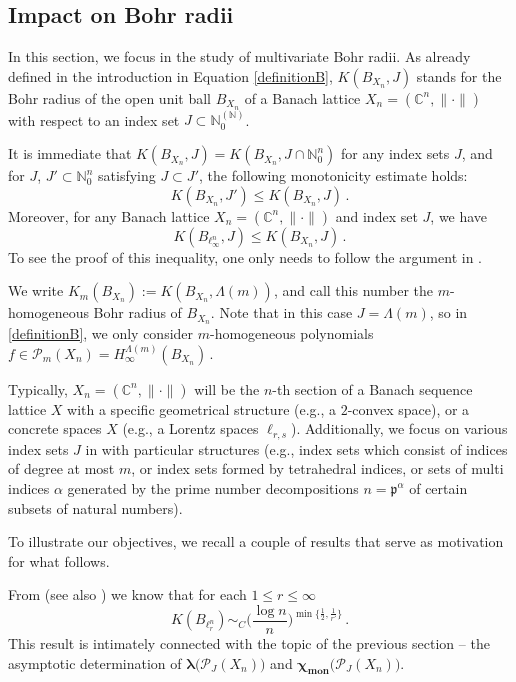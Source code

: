 \documentclass[12pt]{amsart}
\numberwithin{subsection}{section}
\theoremstyle{definition}
\theoremstyle{remark}
\newcommand{\NN}{\mathbb N}
\newcommand{\CC}{\mathbb C}
\DeclareMathOperator{\mon}{mon}
\newcommand{\chimon}{\chi_{\mon}}
\begin{document}
\subsection{Impact on Bohr radii} \label{Part: Bohr radii}

In this section, we focus in the study of multivariate Bohr radii. As already defined in the introduction in Equation
\eqref{definitionB},
$K(B_{X_n},J)$ stands for 
the Bohr radius of the open unit ball $B_{X_n}$ 
of a Banach lattice  ${X_n} = (\CC^n, \| \cdot \|)$
with respect to an index set $J \subset \mathbb{N}_0^{(\NN)}$.

It is immediate that $K(B_{X_n},J) =  K(B_{X_n},J \cap \mathbb{N}_0^n)$ for any index sets $J$, and for $J$, $J' \subset \mathbb{N}_0^{n}$ satisfying $J \subset J'$, the following monotonicity estimate holds:
\begin{equation}\label{rem: bohr radii monotony}
K(B_{X_n},J') \le K(B_{X_n},J)\,.
\end{equation}
Moreover, for any Banach lattice  ${X_n} = (\CC^n, \| \cdot \|)$ and index set  $J$, we have
\begin{equation}\label{lowinfty}
K(B_{\ell_\infty^n},J) \leq K(B_{X_n},J)\,.
\end{equation}
To see the proof of this inequality, one only needs to follow the argument
in \cite[Proposition 19.2]{defant2019libro}.

We write $ K_m(B_{X_n}):= K(B_{X_n},\Lambda(m))$,
and call this number  the $m$-homogeneous Bohr radius of $B_{X_n}$. Note that in this case $J=\Lambda(m)$, so in \eqref{definitionB},
we only consider $m$-homogeneous  polynomials $f \in \mathcal{P}_m( X_n) = H^{\Lambda(m)}_\infty (B_{X_n})\,.$

Typically, $X_{n} = (\CC^n, \| \cdot \|)$ will be the $n$-th section of a Banach sequence lattice  $X$ with a specific geometrical
structure (e.g., a $2$-convex space), or a concrete spaces $X$ (e.g., a Lorentz spaces $\ell_{r,s}$). Additionally,  we focus on various
index sets $J$ in with particular  structures (e.g., index sets which consist of indices  of degree at most $m$, or index sets formed
by tetrahedral indices,
or sets of  multi indices $\alpha$ generated by the prime number decompositions $n = \mathfrak{p}^\alpha$ of certain subsets of natural
numbers).

To illustrate our objectives, we recall a couple of results that serve as motivation for what follows.

From \cite{defant2011bohr}
(see also \cite[Theorem 19.1]{defant2019libro}) we know that for each $1  \leq r \leq \infty$
\[
K(B_{\ell_r^n}) \sim_C \Big(\frac{\log n}{n}\Big)^{\min \big\{ \frac{1}{2},\frac{1}{r'} \big\}}\,.
\]
This result is intimately connected with the topic of the previous section -- the asymptotic determination of
$\boldsymbol{\lambda}\big(\mathcal{P}_J(X_n)\big)$ and $\boldsymbol{\chimon}\big(\mathcal{P}_J(X_n)\big)$.
\end{document}
